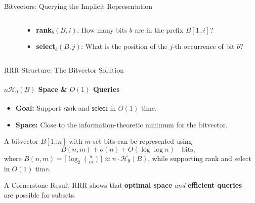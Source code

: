 \begin{frame}{Bitvectors: Querying the Implicit Representation}
    \begin{columns}[T, totalwidth=\textwidth] %
        \begin{column}{0.52\textwidth}
        \end{column}
        \begin{column}{0.45\textwidth}
            \begin{itemize}
                \item<3-> \textbf{\textsf{rank}}$_b(B, i)$: How many bits $b$ are in the prefix $B[1..i]$?
                    \pause %
                \item<5-> \textbf{\textsf{select}}$_b(B, j)$: What is the position of the $j$-th occurrence of bit $b$?
                    \pause %
            \end{itemize}
        \end{column}
    \end{columns}
\end{frame}

\begin{frame}{RRR Structure: The Bitvector Solution}
    \framesubtitle{$n\mathcal{H}_0(B)$ Space \& $O(1)$ Queries}
    \begin{itemize}
        \item \textbf{Goal:} Support $\textsf{rank}$ and $\textsf{select}$ in $O(1)$ time.
        \item \textbf{Space:} Close to the information-theoretic minimum for the bitvector.
    \end{itemize}
    \pause
    \begin{theorem}
        A bitvector $B[1..n]$ with $m$ set bits can be represented using
        \[ B(n, m) + o(n) + O(\log \log n) \quad \text{bits}, \]
        where $B(n, m) = \lceil \log_2 \binom{n}{m} \rceil \approx n \cdot \mathcal{H}_0(B)$, while supporting \textsf{rank} and \textsf{select} in $O(1)$ time.
    \end{theorem}
    \pause
    \begin{alertblock}{A Cornerstone Result}
        RRR shows that \textbf{optimal space} \emph{and} \textbf{efficient queries} are possible for subsets.
    \end{alertblock}
\end{frame}

